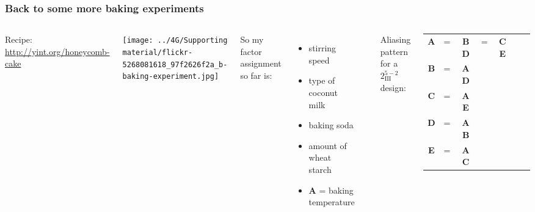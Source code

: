 \begin{frame}\frametitle{Back to some more baking experiments}
	\begin{columns}[T]
		
			\vspace{1cm}
			{\small Recipe: \href{http://yint.org/honeycomb-cake}{http://yint.org/honeycomb-cake}}
		
			\vspace{1cm}
		
			\centerline{\texttt{[image: ../4G/Supporting material/flickr-5268081618\_97f2626f2a\_b-baking-experiment.jpg]}}
			
		
			{\color{myOrange}So my factor assignment so far is:}
			\begin{itemize}
				\item	stirring speed
				\item	type of coconut milk
				\item	baking soda
				\item	amount of wheat starch
				\item	\textbf{A} = baking temperature
			\end{itemize}
			
			\vspace{0.4cm}
			\hrule
			
			\vspace{0.1cm}
			Aliasing pattern for a $2^{5-2}_{\textrm{III}}$ design:
			\begin{tabulary}{\linewidth}{ccccccc}				
				\textbf{A} & = & \textbf{BD} & = & \textbf{CE}  \\
				\textbf{B} & = & \textbf{AD} & & \\
				\textbf{C} & = & \textbf{AE} & & \\
				\textbf{D} & = & \textbf{AB} & & \\
				\textbf{E} & = & \textbf{AC} & & 
			\end{tabulary}
			
	\end{columns}
	
	\vspace{1cm}

	
\end{frame}

